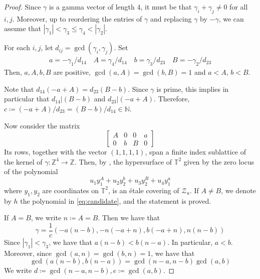 \documentclass[11pt, reqno]{amsart}
\theoremstyle{plain}
\theoremstyle{definition}
\newcommand{\NN}{\mathbb{N}}
\newcommand{\ZZ}{\mathbb{Z}}
\newcommand{\TT}{\mathbb{T}}
\newcommand{\ga}{\gamma}
\begin{document}
\begin{proof}
Since $\gamma$ is a gamma vector of length $4$, it must be that $\gamma_i+\gamma_j \neq 0$ for all $i,j$.  
Moreover, up to reordering the entries of $\gamma$ and replacing $\gamma$ by $-\gamma$, we can assume that  $|\gamma_1| <\gamma_3 \le \gamma_4 < |\gamma_2|$.

For each $i,j$, let $d_{ij}= \gcd(\gamma_i,\gamma_j)$.
Set 
\begin{align*}
a= -\ga_1 / d_{14} \quad    A = \ga_4/d_{14} \quad   b= \ga_3/ d_{23} \quad 
     B = -\ga_2/ d_{23} 
\end{align*}
Then, $a,A,b,B$ are positive, $\gcd(a,A)= \gcd(b,B)=1$ and $a<A$, $b<B$.

Note that 
$
d_{14}(-a+A)=d_{23}(B-b)$. Since $\gamma$ is prime, this implies in particular that $d_{14}|(B-b)$ and $d_{23}|(-a+A)$. Therefore, 
$
c \coloneqq (-a+A)/d_{23}=(B-b)/d_{14} \in \NN
$. 

Now consider the matrix
\[
\begin{bmatrix}
    A & 0 &0 &a \\
    0 & b & B &0
\end{bmatrix}
\]
Its rows, together with the vector $(1,1,1,1)$, span a finite index sublattice of the kernel of $\gamma \colon \ZZ^4 \to \ZZ$. Then, by \cite[Proposition 3.6]{asem-hgms-toric}, 
the hypersurface of $\TT^2$ given by the zero locus of the polynomial
\begin{equation}
\label{eq:candidate}
u_1  y_1^{A}+ u_2 y_2^{b}  +u_3 y_2^{B} +u_4 y_1^{a}
\end{equation}
where $y_1, y_2$ are coordinates on $\TT^2$,
is an étale covering of $\mathcal{Z}_{u}$. 
If $A\neq B$, 
we denote by $h$ the polynomial in \eqref{eq:candidate}, and the statement is proved.

If $A=B$, we write $n \coloneqq A=B$. Then we have that 
\[
\gamma=\frac{1}{c}\left(-a(n-b), -n(-a+n), b(-a+n), n(n-b)\right)
\]
Since $|\gamma_1| < \gamma_3$, we have that $a(n-b)< b(n-a)$. In particular, $a < b$.  Moreover, since $\gcd(a,n)=\gcd(b,n)=1$, we have that
\[
\gcd(a(n-b), b(n-a))= \gcd(n-a,n-b) \gcd(a,b) 
\] We write $d\coloneqq\gcd(n-a,n-b), e\coloneqq \gcd(a,b)$.


\end{proof}
\end{document}
